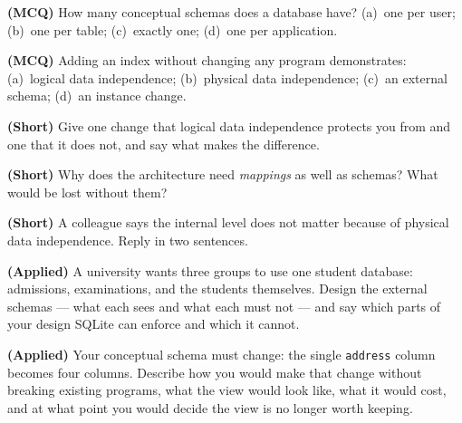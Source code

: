 \begin{reviewq}
  \item \textbf{(MCQ)} How many conceptual schemas does a database have?
        (a)~one per user; (b)~one per table; (c)~exactly one; (d)~one per
        application.
  \item \textbf{(MCQ)} Adding an index without changing any program
        demonstrates: (a)~logical data independence; (b)~physical data
        independence; (c)~an external schema; (d)~an instance change.
  \item \textbf{(Short)} Give one change that logical data independence
        protects you from and one that it does not, and say what makes the
        difference.
  \item \textbf{(Short)} Why does the architecture need \emph{mappings} as well
        as schemas? What would be lost without them?
  \item \textbf{(Short)} A colleague says the internal level does not matter
        because of physical data independence. Reply in two sentences.
  \item \textbf{(Applied)} A university wants three groups to use one student
        database: admissions, examinations, and the students themselves. Design
        the external schemas --- what each sees and what each must not --- and
        say which parts of your design SQLite can enforce and which it cannot.
  \item \textbf{(Applied)} Your conceptual schema must change: the single
        \texttt{address} column becomes four columns. Describe how you would
        make that change without breaking existing programs, what the view
        would look like, what it would cost, and at what point you would decide
        the view is no longer worth keeping.
\end{reviewq}
